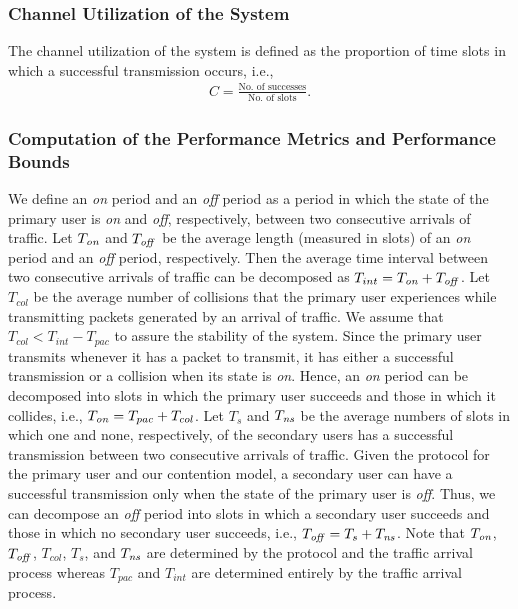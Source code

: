 \documentclass[12pt,draftclsnofoot,onecolumn]{IEEEtran}
\begin{document}
\subsubsection{Channel Utilization of the System}

The channel utilization of the system is defined as the proportion of
time slots in which a successful transmission occurs, i.e.,
\begin{align*}
C = \frac{\textrm{No. of successes}}{\textrm{No. of slots}}.
\end{align*}

\subsubsection{Computation of the Performance Metrics and Performance Bounds}

We define an \emph{on} period and an \emph{off} period as a period
in which the state of the primary user is \emph{on} and \emph{off}, respectively,
between two consecutive arrivals of traffic.
Let $T_{\textrm{\emph{on}}}$ and $T_{\textrm{\emph{off}}}$ be the average length
(measured in slots) of an \emph{on} period and an \emph{off} period, respectively.
Then the average time interval between two consecutive arrivals of traffic can be decomposed as
$T_{int} = T_{\textrm{\emph{on}}} + T_{\textrm{\emph{off}}}$.
Let $T_{col}$ be the average number of collisions that the primary user experiences
while transmitting packets generated by an arrival of traffic.
We assume that $T_{col} < T_{int} - T_{pac}$ to assure the stability of the system.
Since the primary user transmits whenever it has a packet to transmit, it has either
a successful transmission or a collision when its state is \emph{on}.
Hence, an \emph{on} period can be decomposed into slots in which the primary user succeeds
and those in which it collides, i.e., $T_{\textrm{\emph{on}}} = T_{pac} + T_{col}$.
Let $T_s$ and $T_{\textrm{\emph{ns}}}$ be the average numbers of slots
in which one and none, respectively, of the
secondary users has a successful transmission between two consecutive arrivals of traffic.
Given the protocol for the primary user and our contention model,
a secondary user can have a successful transmission only when the state of the
primary user is \emph{off}. Thus, we can decompose an \emph{off} period into slots in which
a secondary user succeeds and those in which no secondary user succeeds, i.e.,
$T_{\textrm{\emph{off}}} = T_s + T_{\textrm{\emph{ns}}}$.
Note that $T_{\textrm{\emph{on}}}$, $T_{\textrm{\emph{off}}}$, $T_{col}$, $T_s$, and $T_{\textrm{\emph{ns}}}$ are determined by the protocol
and the traffic arrival process whereas
$T_{pac}$ and $T_{int}$ are determined entirely by the traffic arrival process.
\end{document}
